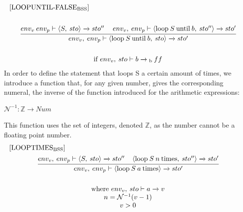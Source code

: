 \begin{equation}
\begin{split}
\begin{minipage}{\linewidth}
$[\text{LOOPUNTIL-FALSE}_\text{BSS}]$
\end{minipage}
\\\\
\begin{minipage}{\linewidth}
\centering
$\cfrac{env_v \: env_p \vdash \langle S, \: sto \rangle \xrightarrow{} sto'' \quad\: env_v, \: env_p \vdash \langle \text{loop} \: S \: \text{until} \: b, \: sto'' \rangle \xrightarrow{} sto'}{env_v, \: env_p \vdash \langle \text{loop} \: S \: \text{until} \: b, \: sto \rangle \xrightarrow{} sto'}$ 
\end{minipage}
\\\\
\begin{minipage}{\linewidth}
\centering
if $env_v, \: sto \vdash b \xrightarrow{}\textsubscript{b} \: ff$
\end{minipage}
\end{split}
\end{equation}
In order to define the statement that loops S a certain amount of times, we introduce a function that, for any given number, gives the corresponding numeral, the inverse of the function introduced for the arithmetic expressions:
\begin{center}
$\mathcal{N}^{-1}: \mathbb{Z} \xrightarrow{} Num$
\end{center}
This function uses the set of integers, denoted $\mathbb{Z}$, as the number cannot be a floating point number.
\begin{equation}\label{rule:looptimesbss}
\begin{split}
\begin{minipage}{\linewidth}
$[\text{LOOPTIMES}_\text{BSS}]$
\end{minipage}
\\
\begin{minipage}{\linewidth}
\centering
$\cfrac{env_v, \: env_p \vdash \langle S, \: sto \rangle \xrightarrow{} sto'' \: \: \: \: \: \langle \text{loop} \: S \: n \: \text{times}, \: sto'' \rangle \xrightarrow{} sto'}{env_v, \: env_p \vdash \langle \text{loop} \: S \: a \: \text{times} \rangle \xrightarrow{} sto'}$ 
\end{minipage}
\\\\
\begin{minipage}{\linewidth}
\centering
where $env_v, \: sto \vdash a \xrightarrow{} v$
\\
$n = \mathcal{N}^{-1}(v-1)$
\\
$v > 0$
\end{minipage}
\end{split}
\end{equation}

